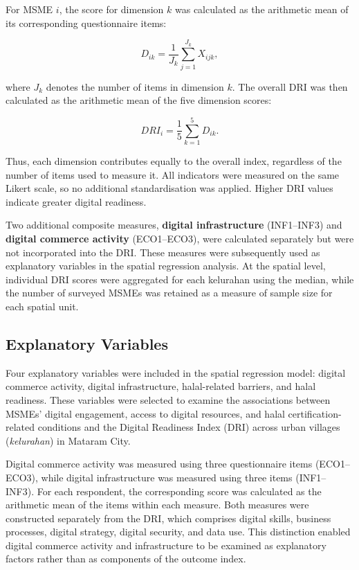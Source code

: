 \documentclass[
  default,
]{sn-jnl}
\begin{document}
For MSME \(i\), the score for dimension \(k\) was calculated as the
arithmetic mean of its corresponding questionnaire items:

\[
D_{ik}=\frac{1}{J_k}\sum_{j=1}^{J_k}X_{ijk},
\]

where \(J_k\) denotes the number of items in dimension \(k\). The
overall DRI was then calculated as the arithmetic mean of the five
dimension scores:

\[
DRI_i=\frac{1}{5}\sum_{k=1}^{5}D_{ik}.
\]

Thus, each dimension contributes equally to the overall index,
regardless of the number of items used to measure it. All indicators
were measured on the same Likert scale, so no additional standardisation
was applied. Higher DRI values indicate greater digital readiness.

Two additional composite measures, \textbf{digital infrastructure}
(INF1--INF3) and \textbf{digital commerce activity} (ECO1--ECO3), were
calculated separately but were not incorporated into the DRI. These
measures were subsequently used as explanatory variables in the spatial
regression analysis. At the spatial level, individual DRI scores were
aggregated for each kelurahan using the median, while the number of
surveyed MSMEs was retained as a measure of sample size for each spatial
unit.

\subsection{Explanatory Variables}\label{explanatory-variables}

Four explanatory variables were included in the spatial regression
model: digital commerce activity, digital infrastructure, halal-related
barriers, and halal readiness. These variables were selected to examine
the associations between MSMEs' digital engagement, access to digital
resources, and halal certification-related conditions and the Digital
Readiness Index (DRI) across urban villages (\emph{kelurahan}) in
Mataram City.

Digital commerce activity was measured using three questionnaire items
(ECO1--ECO3), while digital infrastructure was measured using three
items (INF1--INF3). For each respondent, the corresponding score was
calculated as the arithmetic mean of the items within each measure. Both
measures were constructed separately from the DRI, which comprises
digital skills, business processes, digital strategy, digital security,
and data use. This distinction enabled digital commerce activity and
infrastructure to be examined as explanatory factors rather than as
components of the outcome index.
\end{document}
